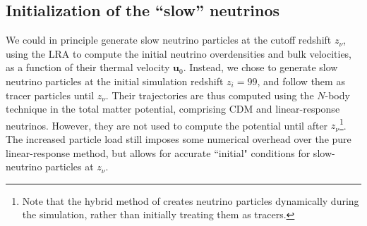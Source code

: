 \documentclass[useAMS, usenatbib]{mnras}
\newcommand{\barr}{\begin{eqnarray}}
\newcommand{\earr}{\end{eqnarray}}
\newcommand{\bs}{\boldsymbol}
\begin{document}


%



\subsection{Initialization of the ``slow'' neutrinos}

We could in principle generate slow neutrino particles at the cutoff redshift $z_\nu$, using the LRA to compute the initial neutrino overdensities and bulk velocities, as a function of their thermal velocity $\bs{u}_0$.
Instead, we chose to generate slow neutrino particles at the initial simulation redshift $z_i = 99$, and follow them as tracer particles until $z_\nu$. Their trajectories are thus computed using the $N$-body technique in the total matter potential, comprising CDM and linear-response neutrinos. However, they are not used to compute the potential until after $z_\nu$\footnote{Note that the hybrid method of \cite{Brandbyge_2010} creates neutrino particles dynamically during the simulation, rather than initially treating them as tracers.}. The increased particle load still imposes some numerical overhead over the pure linear-response method, but allows for accurate ``initial" conditions for slow-neutrino particles at $z_\nu$.
\end{document}
